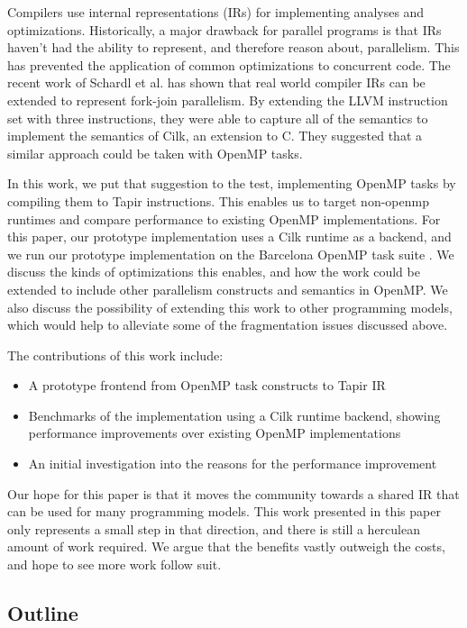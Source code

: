 \documentclass[sigconf]{acmart}
\begin{document}
Compilers use internal representations (IRs) for implementing analyses and
optimizations. Historically, a major drawback for parallel programs is that IRs
haven't had the ability to represent, and therefore reason about, parallelism.
This has prevented the application of common optimizations to concurrent code.
The recent work of Schardl et al.  \cite{shardl2017} has shown that real world
compiler IRs can be extended to represent fork-join parallelism. By extending
the LLVM instruction set with three instructions, they were able to capture all
of the semantics to implement the semantics of Cilk, an extension to C. They
suggested that a similar approach could be taken with OpenMP tasks.

In this work, we put that suggestion to the test, implementing OpenMP tasks by
compiling them to Tapir instructions. This enables us to target non-openmp
runtimes and compare performance to existing OpenMP implementations. For this
paper, our prototype implementation uses a Cilk runtime as a backend, and we run
our prototype implementation on the Barcelona OpenMP task suite
\cite{barcelona}. We discuss the kinds of optimizations this enables, and how
the work could be extended to include other parallelism constructs and semantics
in OpenMP. We also discuss the possibility of extending this work to other
programming models, which would help to alleviate some of the fragmentation
issues discussed above.

The contributions of this work include: 

\begin{itemize}
\item A prototype frontend from OpenMP task constructs to Tapir IR
\item Benchmarks of the implementation using a Cilk runtime backend, showing
performance improvements over existing OpenMP implementations
\item An initial investigation into the reasons for the performance improvement
\end{itemize}

Our hope for this paper is that it moves the community towards a shared IR that
can be used for many programming models. This work presented in this paper only
represents a small step in that direction, and there is still a herculean amount
of work required. We argue that the benefits vastly outweigh the costs, and
hope to see more work follow suit. 

\subsection{Outline}
\end{document}
